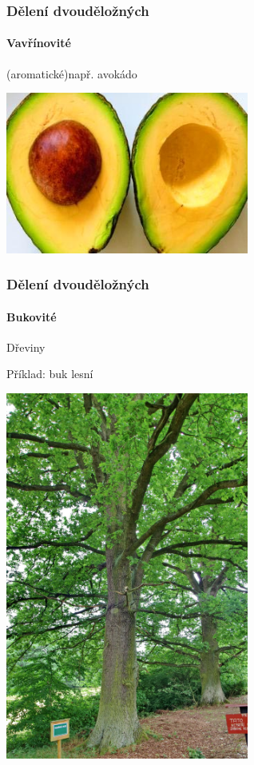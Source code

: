 \documentclass{beamer}
\begin{document}
\begin{frame}
\frametitle{Dělení dvouděložných}
	\framesubtitle{Vavřínovité}(aromatické)např. avokádo

\begin{center}\includegraphics[width=8cm]{Avokado.jpg}\end{center}
\end{frame}
\begin{frame}
\frametitle{Dělení dvouděložných}
	\framesubtitle{Bukovité}Dřeviny

Příklad: buk lesní

\begin{center}\includegraphics[width=8cm]{Buk_a_dub_v_Doubrave.jpg}\end{center}
\end{frame}
\end{document}
